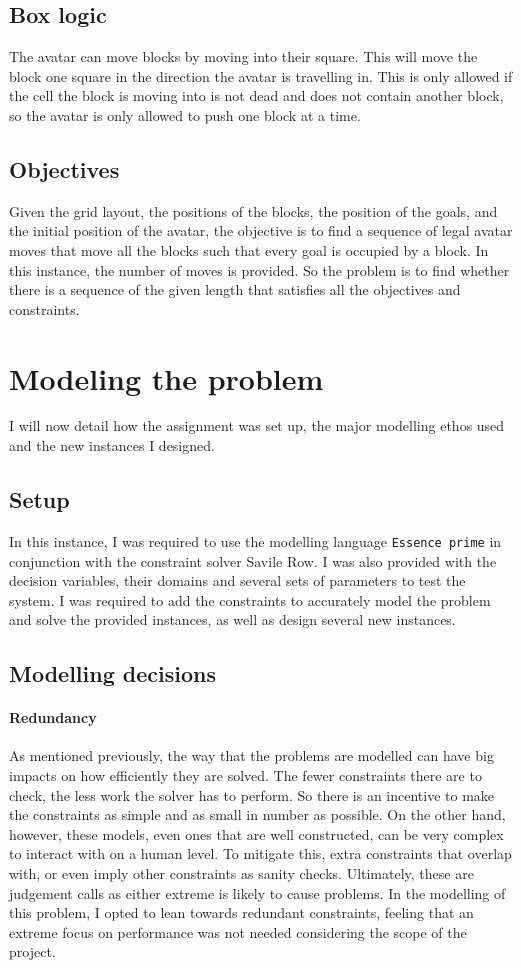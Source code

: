 \documentclass[british]{article}
\newcommand{\code}[1]{\texttt{#1}}
\begin{document}
	
	\subsection{Box logic}
	The avatar can move blocks by moving into their square. This will move the block one square in the direction the avatar is travelling in. This is only allowed if the cell the block is moving into is not dead and does not contain another block, so the avatar is only allowed to push one block at a time.
	
	\subsection{Objectives}
	Given the grid layout, the positions of the blocks, the position of the goals, and the initial position of the avatar, the objective is to find a sequence of legal avatar moves that move all the blocks such that every goal is occupied by a block. In this instance, the number of moves is provided. So the problem is to find whether there is a sequence of the given length that satisfies all the objectives and constraints. 
	
	
	\section{Modeling the problem}
	I will now detail how the assignment was set up, the major modelling ethos used and the new instances I designed. 
	\label{model}
	\subsection{Setup}
	In this instance, I was required to use the modelling language \code{Essence prime} in conjunction with the constraint solver Savile Row. I was also provided with the decision variables, their domains and several sets of parameters to test the system. I was required to add the constraints to accurately model the problem and solve the provided instances, as well as design several new instances. 
	
	\subsection{Modelling decisions}
	\paragraph{Redundancy}
	As mentioned previously, the way that the problems are modelled can have big impacts on how efficiently they are solved. The fewer constraints there are to check, the less work the solver has to perform. So there is an incentive to make the constraints as simple and as small in number as possible. On the other hand, however, these models, even ones that are well constructed, can be very complex to interact with on a human level. To mitigate this, extra constraints that overlap with, or even imply other constraints as sanity checks. Ultimately, these are judgement calls as either extreme is likely to cause problems. In the modelling of this problem, I opted to lean towards redundant constraints, feeling that an extreme focus on performance was not needed considering the scope of the project. 
	
\end{document}
